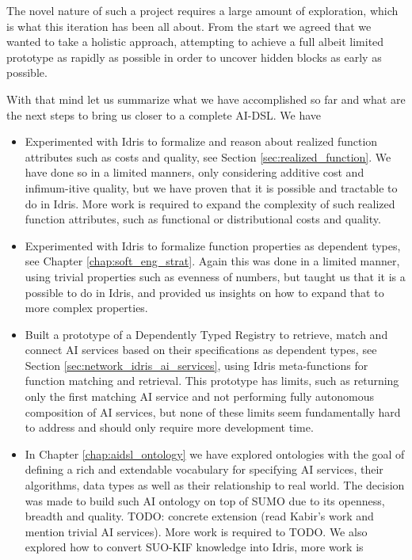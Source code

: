 \documentclass[]{report}
\begin{document}
The novel nature of such a project requires a large amount of
exploration, which is what this iteration has been all about.  From
the start we agreed that we wanted to take a holistic approach, attempting
to achieve a full albeit limited prototype as rapidly as possible in
order to uncover hidden blocks as early as possible.

With that mind let us summarize what we have accomplished so far and
what are the next steps to bring us closer to a complete AI-DSL.  We
have
\begin{itemize}
\item Experimented with Idris to formalize and reason about realized
  function attributes such as costs and quality, see Section
  \ref{sec:realized_function}.  We have done so in a limited manners, only
  considering additive cost and infimum-itive quality, but we have
  proven that it is possible and tractable to do in Idris.  More work
  is required to expand the complexity of such realized function
  attributes, such as functional or distributional costs and quality.
\item Experimented with Idris to formalize function properties as
  dependent types, see Chapter \ref{chap:soft_eng_strat}.  Again this
  was done in a limited manner, using trivial properties such as
  evenness of numbers, but taught us that it is a possible to do in
  Idris, and provided us insights on how to expand that to more
  complex properties.
\item Built a prototype of a Dependently Typed Registry to retrieve,
  match and connect AI services based on their specifications as
  dependent types, see Section \ref{sec:network_idris_ai_services}, using Idris
  meta-functions for function matching and retrieval.  This prototype
  has limits, such as returning only the first matching AI service and
  not performing fully autonomous composition of AI services, but none
  of these limits seem fundamentally hard to address and should only
  require more development time.
\item In Chapter \ref{chap:aidsl_ontology} we have explored ontologies
  with the goal of defining a rich and extendable vocabulary for
  specifying AI services, their algorithms, data types as well as
  their relationship to real world.  The decision was made to build
  such AI ontology on top of SUMO due to its openness, breadth and
  quality.  TODO: concrete extension (read Kabir's work and mention
  trivial AI services).  More work is required to TODO.  We also
  explored how to convert SUO-KIF knowledge into Idris, more work is

\end{itemize}
\end{document}
